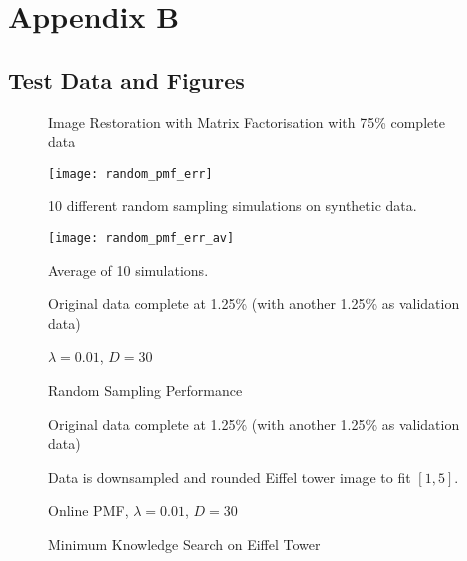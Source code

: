 \ifpdf
    \graphicspath{{Appendix2/Appendix2Figs/PN1G/}{Appendix2/Appendix2Figs/PDF/}{Appendix2/Appendix2Figs/}}
\else
    \graphicspath{{Appendix2/Appendix2Figs/EPS/}{Appendix2/Appendix2Figs/}}
\fi
\setcounter{section}{0}
\chapter{Appendix B}
\section{Test Data and Figures}

\begin{figure}[!htbp]
  \begin{center}
    \resizebox{\textwidth}{!}{}
    \caption{Image Restoration with Matrix Factorisation with 75\% complete data}
    \label{Image Restore}
  \end{center}
\end{figure}

\begin{figure}[!htbp]
  \begin{center}
    \texttt{[image: random\_pmf\_err]}

10 different random sampling simulations on synthetic data.

    \texttt{[image: random\_pmf\_err\_av]}
  
Average of 10 simulations.
\end{center}
Original data complete at 1.25\% (with another 1.25\% as validation data)

$\lambda = 0.01$, $D=30$
    \caption{Random Sampling Performance}
    \label{fig:RandomPMF}
\end{figure}


\begin{figure}[!htbp]
  \begin{center}
    \resizebox{\textwidth}{!}{}
\end{center}
Original data complete at 1.25\% (with another 1.25\% as validation data)

Data is downsampled and rounded Eiffel tower image to fit $[1,5]$.

Online PMF, $\lambda = 0.01$, $D=30$
    \caption{Minimum Knowledge Search on Eiffel Tower}
    \label{fig:eiffel_active_mks}
\end{figure}

